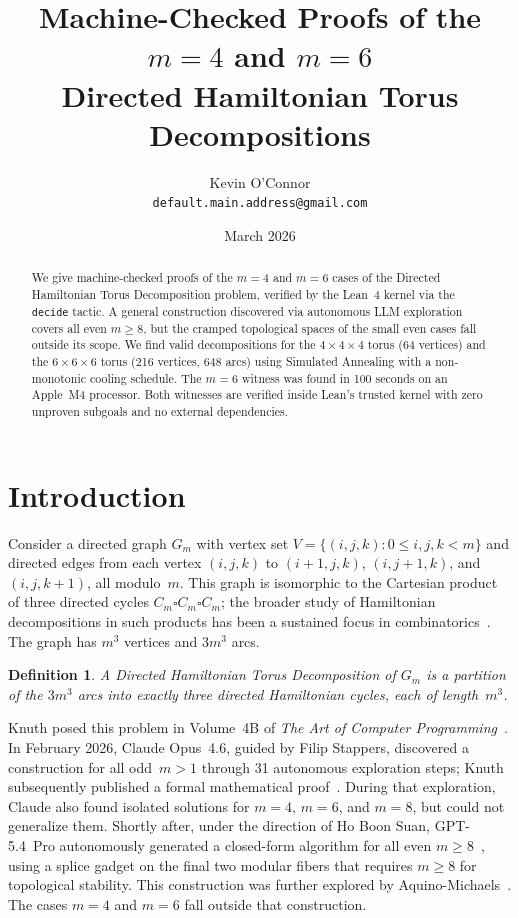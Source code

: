 \documentclass[11pt]{article}
\title{Machine-Checked Proofs of the $m=4$ and $m=6$ \\
Directed Hamiltonian Torus Decompositions}
\author{
  Kevin O'Connor\\
  \texttt{default.main.address@gmail.com}
}
\date{March 2026}
\theoremstyle{plain}
\newtheorem{definition}{Definition}
\begin{document}
\maketitle

\begin{abstract}
We give machine-checked proofs of the $m=4$ and $m=6$ cases of the Directed
Hamiltonian Torus Decomposition problem, verified by the Lean~4 kernel via
the \texttt{decide} tactic. A general construction discovered via
autonomous LLM exploration covers all even $m \ge 8$, but the cramped
topological spaces of the small even cases fall outside its scope.
We find valid decompositions for the $4 \times 4 \times 4$ torus
(64 vertices) and the $6 \times 6 \times 6$ torus (216 vertices, 648 arcs)
using Simulated Annealing with a non-monotonic cooling schedule. The $m=6$
witness was found in 100 seconds on an Apple~M4 processor. Both witnesses
are verified inside Lean's trusted kernel with zero unproven subgoals and
no external dependencies.
\end{abstract}

\section{Introduction}

Consider a directed graph $G_m$ with vertex set
$V = \{(i, j, k) : 0 \le i, j, k < m\}$ and directed edges from each vertex
$(i,j,k)$ to $(i{+}1, j, k)$, $(i, j{+}1, k)$, and $(i, j, k{+}1)$, all
modulo~$m$. This graph is isomorphic to the Cartesian product of three
directed cycles $C_m \square C_m \square C_m$; the broader study of
Hamiltonian decompositions in such products has been a sustained focus
in combinatorics~\cite{darijani2025}. The graph has $m^3$ vertices and
$3m^3$ arcs.

\begin{definition}
A \emph{Directed Hamiltonian Torus Decomposition} of $G_m$ is a partition of
the $3m^3$ arcs into exactly three directed Hamiltonian cycles, each of
length~$m^3$.
\end{definition}

Knuth posed this problem in Volume~4B of \emph{The Art of Computer
Programming}~\cite{knuth2026}. In February 2026, Claude Opus~4.6, guided
by Filip Stappers, discovered a construction for all odd~$m > 1$ through
31 autonomous exploration steps; Knuth subsequently published a formal
mathematical proof~\cite{knuth2026}. During that exploration, Claude also
found isolated solutions for $m = 4$, $m = 6$, and $m = 8$, but could
not generalize them. Shortly after, under the direction of Ho Boon
Suan, GPT-5.4~Pro autonomously generated a closed-form algorithm for
all even $m \ge 8$~\cite{hoboonsuan2026}, using a splice gadget on
the final two modular fibers that requires $m \ge 8$ for topological
stability. This construction was further explored by
Aquino-Michaels~\cite{aquino2026}.
The cases $m = 4$ and $m = 6$ fall outside that construction.
\end{document}
